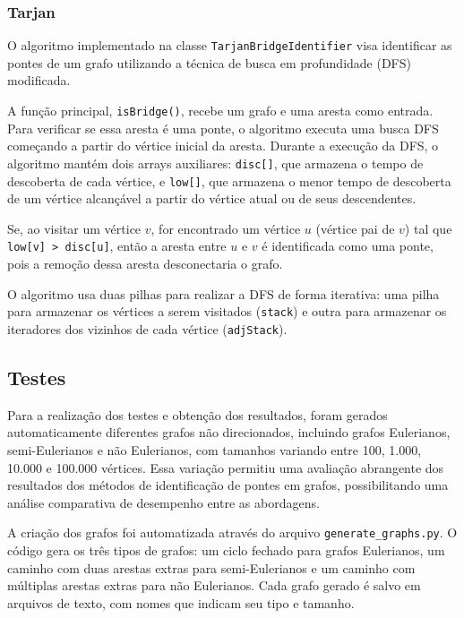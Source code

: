\subsubsection{\esp Tarjan}

O algoritmo implementado na classe \texttt{TarjanBridgeIdentifier} visa identificar as pontes de um grafo utilizando a técnica de busca em profundidade (DFS) modificada.

A função principal, \texttt{isBridge()}, recebe um grafo e uma aresta como entrada. Para verificar se essa aresta é uma ponte, o algoritmo executa uma busca DFS começando a partir do vértice inicial da aresta. Durante a execução da DFS, o algoritmo mantém dois arrays auxiliares: \texttt{disc[]}, que armazena o tempo de descoberta de cada vértice, e \texttt{low[]}, que armazena o menor tempo de descoberta de um vértice alcançável a partir do vértice atual ou de seus descendentes.

Se, ao visitar um vértice \(v\), for encontrado um vértice \(u\) (vértice pai de \(v\)) tal que \texttt{low[v] > disc[u]}, então a aresta entre \(u\) e \(v\) é identificada como uma ponte, pois a remoção dessa aresta desconectaria o grafo.

O algoritmo usa duas pilhas para realizar a DFS de forma iterativa: uma pilha para armazenar os vértices a serem visitados (\texttt{stack}) e outra para armazenar os iteradores dos vizinhos de cada vértice (\texttt{adjStack}).



\subsection{\esp Testes}

Para a realização dos testes e obtenção dos resultados, foram gerados automaticamente diferentes grafos não direcionados, incluindo grafos Eulerianos, semi-Eulerianos e não Eulerianos, com tamanhos variando entre 100, 1.000, 10.000 e 100.000 vértices. Essa variação permitiu uma avaliação abrangente dos resultados dos métodos de identificação de pontes em grafos, possibilitando uma análise comparativa de desempenho entre as abordagens.

A criação dos grafos foi automatizada através do arquivo \texttt{generate\_graphs.py}. O código gera os três tipos de grafos: um ciclo fechado para grafos Eulerianos, um caminho com duas arestas extras para semi-Eulerianos e um caminho com múltiplas arestas extras para não Eulerianos. Cada grafo gerado é salvo em arquivos de texto, com nomes que indicam seu tipo e tamanho.

